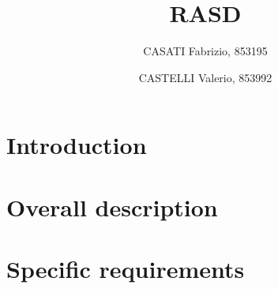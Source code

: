 

\usepackage{longtable}



\title{RASD}
\author{
	CASATI Fabrizio, 853195
	\and
	CASTELLI Valerio, 853992
}

\maketitle
\tableofcontents

\chapter{Introduction}


\chapter{Overall description}


\chapter{Specific requirements}


